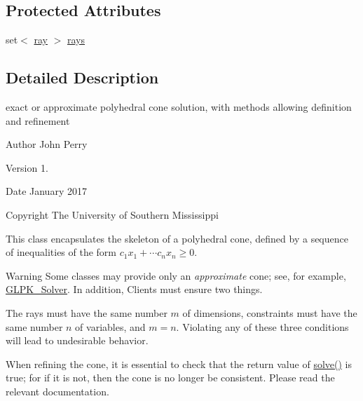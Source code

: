 \subsection*{Protected Attributes}
\begin{DoxyCompactItemize}
\item 
set$<$ \hyperlink{classray}{ray} $>$ \hyperlink{class_l_p___solver_aa89c9167eb3ef921b57d74057217f407}{rays}
\end{DoxyCompactItemize}


\subsection{Detailed Description}
exact or approximate polyhedral cone solution, with methods allowing definition and refinement 

\begin{DoxyAuthor}{Author}
John Perry 
\end{DoxyAuthor}
\begin{DoxyVersion}{Version}
1. 
\end{DoxyVersion}
\begin{DoxyDate}{Date}
January 2017 
\end{DoxyDate}
\begin{DoxyCopyright}{Copyright}
The University of Southern Mississippi
\end{DoxyCopyright}
This class encapsulates the skeleton of a polyhedral cone, defined by a sequence of inequalities of the form $ c_1 x_1 + \cdots c_n x_n \geq 0 $.

\begin{DoxyWarning}{Warning}
Some classes may provide only an {\itshape approximate} cone; see, for example, \hyperlink{class_g_l_p_k___solver}{G\+L\+P\+K\+\_\+\+Solver}. In addition, Clients must ensure two things.
\begin{DoxyEnumerate}
\item The rays must have the same number $ m $ of dimensions, constraints must have the same number $ n $ of variables, and $ m=n $. Violating any of these three conditions will lead to undesirable behavior.
\item When refining the cone, it is essential to check that the return value of \hyperlink{class_l_p___solver_abd84374c52124116becc8924dc74e12d}{solve()} is {\ttfamily true}; for if it is not, then the cone is no longer be consistent. Please read the relevant documentation. 
\end{DoxyEnumerate}
\end{DoxyWarning}


